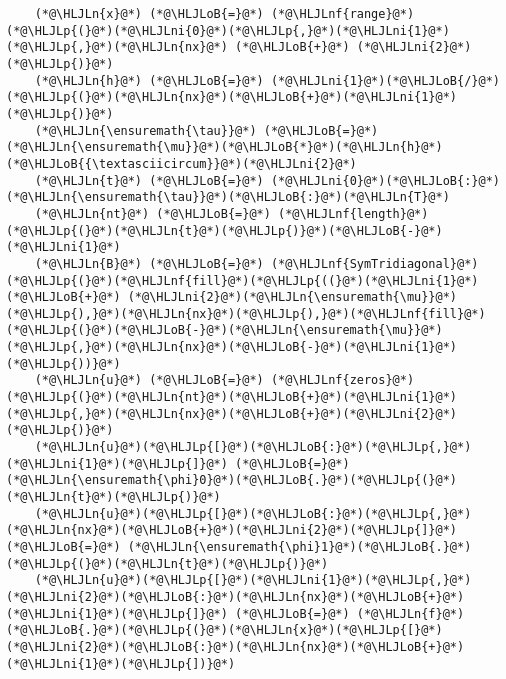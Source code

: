 \documentclass[12pt,landscape]{article}
\newcommand{\HLJLn}[1]{#1}
\newcommand{\HLJLnf}[1]{\textcolor[RGB]{66,102,213}{#1}}
\newcommand{\HLJLni}[1]{\textcolor[RGB]{59,151,46}{#1}}
\newcommand{\HLJLoB}[1]{\textcolor[RGB]{102,102,102}{\textbf{#1}}}
\newcommand{\HLJLp}[1]{#1}
\begin{document}
{\begin{lstlisting}
    (*@\HLJLn{x}@*) (*@\HLJLoB{=}@*) (*@\HLJLnf{range}@*)(*@\HLJLp{(}@*)(*@\HLJLni{0}@*)(*@\HLJLp{,}@*)(*@\HLJLni{1}@*)(*@\HLJLp{,}@*)(*@\HLJLn{nx}@*) (*@\HLJLoB{+}@*) (*@\HLJLni{2}@*)(*@\HLJLp{)}@*)
    (*@\HLJLn{h}@*) (*@\HLJLoB{=}@*) (*@\HLJLni{1}@*)(*@\HLJLoB{/}@*)(*@\HLJLp{(}@*)(*@\HLJLn{nx}@*)(*@\HLJLoB{+}@*)(*@\HLJLni{1}@*)(*@\HLJLp{)}@*)
    (*@\HLJLn{\ensuremath{\tau}}@*) (*@\HLJLoB{=}@*) (*@\HLJLn{\ensuremath{\mu}}@*)(*@\HLJLoB{*}@*)(*@\HLJLn{h}@*)(*@\HLJLoB{{\textasciicircum}}@*)(*@\HLJLni{2}@*)
    (*@\HLJLn{t}@*) (*@\HLJLoB{=}@*) (*@\HLJLni{0}@*)(*@\HLJLoB{:}@*)(*@\HLJLn{\ensuremath{\tau}}@*)(*@\HLJLoB{:}@*)(*@\HLJLn{T}@*)
    (*@\HLJLn{nt}@*) (*@\HLJLoB{=}@*) (*@\HLJLnf{length}@*)(*@\HLJLp{(}@*)(*@\HLJLn{t}@*)(*@\HLJLp{)}@*)(*@\HLJLoB{-}@*)(*@\HLJLni{1}@*)
    (*@\HLJLn{B}@*) (*@\HLJLoB{=}@*) (*@\HLJLnf{SymTridiagonal}@*)(*@\HLJLp{(}@*)(*@\HLJLnf{fill}@*)(*@\HLJLp{((}@*)(*@\HLJLni{1}@*) (*@\HLJLoB{+}@*) (*@\HLJLni{2}@*)(*@\HLJLn{\ensuremath{\mu}}@*)(*@\HLJLp{),}@*)(*@\HLJLn{nx}@*)(*@\HLJLp{),}@*)(*@\HLJLnf{fill}@*)(*@\HLJLp{(}@*)(*@\HLJLoB{-}@*)(*@\HLJLn{\ensuremath{\mu}}@*)(*@\HLJLp{,}@*)(*@\HLJLn{nx}@*)(*@\HLJLoB{-}@*)(*@\HLJLni{1}@*)(*@\HLJLp{))}@*)
    (*@\HLJLn{u}@*) (*@\HLJLoB{=}@*) (*@\HLJLnf{zeros}@*)(*@\HLJLp{(}@*)(*@\HLJLn{nt}@*)(*@\HLJLoB{+}@*)(*@\HLJLni{1}@*)(*@\HLJLp{,}@*)(*@\HLJLn{nx}@*)(*@\HLJLoB{+}@*)(*@\HLJLni{2}@*)(*@\HLJLp{)}@*)
    (*@\HLJLn{u}@*)(*@\HLJLp{[}@*)(*@\HLJLoB{:}@*)(*@\HLJLp{,}@*)(*@\HLJLni{1}@*)(*@\HLJLp{]}@*) (*@\HLJLoB{=}@*) (*@\HLJLn{\ensuremath{\phi}0}@*)(*@\HLJLoB{.}@*)(*@\HLJLp{(}@*)(*@\HLJLn{t}@*)(*@\HLJLp{)}@*)
    (*@\HLJLn{u}@*)(*@\HLJLp{[}@*)(*@\HLJLoB{:}@*)(*@\HLJLp{,}@*)(*@\HLJLn{nx}@*)(*@\HLJLoB{+}@*)(*@\HLJLni{2}@*)(*@\HLJLp{]}@*) (*@\HLJLoB{=}@*) (*@\HLJLn{\ensuremath{\phi}1}@*)(*@\HLJLoB{.}@*)(*@\HLJLp{(}@*)(*@\HLJLn{t}@*)(*@\HLJLp{)}@*)
    (*@\HLJLn{u}@*)(*@\HLJLp{[}@*)(*@\HLJLni{1}@*)(*@\HLJLp{,}@*)(*@\HLJLni{2}@*)(*@\HLJLoB{:}@*)(*@\HLJLn{nx}@*)(*@\HLJLoB{+}@*)(*@\HLJLni{1}@*)(*@\HLJLp{]}@*) (*@\HLJLoB{=}@*) (*@\HLJLn{f}@*)(*@\HLJLoB{.}@*)(*@\HLJLp{(}@*)(*@\HLJLn{x}@*)(*@\HLJLp{[}@*)(*@\HLJLni{2}@*)(*@\HLJLoB{:}@*)(*@\HLJLn{nx}@*)(*@\HLJLoB{+}@*)(*@\HLJLni{1}@*)(*@\HLJLp{])}@*)


\end{lstlisting}}
\end{document}
